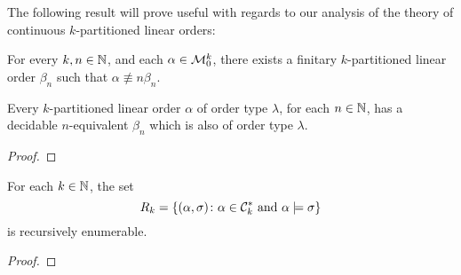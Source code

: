 The following result will prove useful with regards to our analysis of the  theory of continuous $k$-partitioned linear orders:
\begin{thm}
	For every $k,n\in\mathbb{N}$, and each $\alpha\in\mathcal{M}_0^k$, there exists a finitary $k$-partitioned linear order $\beta_n$ such that $\alpha\nequiv{n}\beta_n$.
\end{thm}

\begin{prp}
	Every $k$-partitioned linear order $\alpha$ of order type $\lambda$, for each $n\in\mathbb{N}$, has a decidable $n$-equivalent $\beta_n$ which is also of order type $\lambda$.
\end{prp}
\begin{proof}
\end{proof}

\begin{lem}
	For each $k\in\mathbb{N}$, the set
	\begin{equation}
		R_k=\left\lbrace (\alpha,\sigma)\colon \alpha\in\mathcal{C}^\ast_k\text{ and }\alpha\models\sigma \right\rbrace
	\end{equation}
	is recursively enumerable.
\end{lem}
\begin{proof}
\end{proof}
